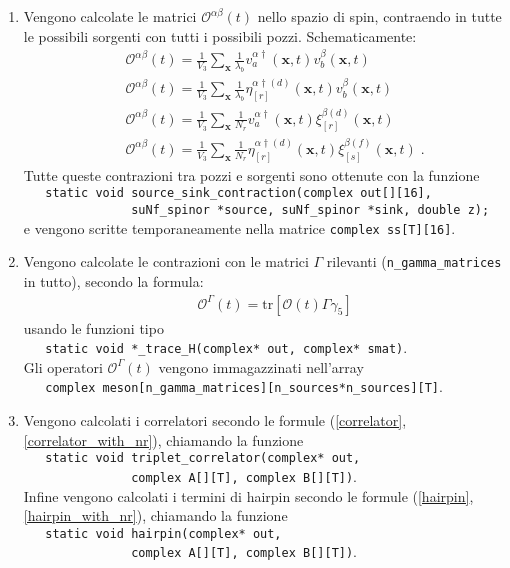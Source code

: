\documentclass[a4paper]{article}
\newcommand{\tr}{\mathrm{tr}}
\newcommand{\point}{\; .}
\begin{document}
\begin{enumerate}
\item Vengono calcolate le matrici $\mathcal{O}^{\alpha\beta}(t)$ nello spazio di spin, contraendo in tutte le possibili sorgenti con tutti i possibili pozzi. Schematicamente:
\begin{eqnarray*}
&& \mathcal{O}^{\alpha\beta}(t) = \frac{1}{V_3} \sum_{\mathbf{x}} \frac{1}{\lambda_b} v^{\alpha\dagger}_a(\mathbf{x},t) v^\beta_b(\mathbf{x},t) \\
&& \mathcal{O}^{\alpha\beta}(t) = \frac{1}{V_3} \sum_{\mathbf{x}} \frac{1}{\lambda_b} \eta^{\alpha\dagger(d)}_{[r]}(\mathbf{x},t) v^\beta_b(\mathbf{x},t) \\
&& \mathcal{O}^{\alpha\beta}(t) = \frac{1}{V_3} \sum_{\mathbf{x}} \frac{1}{N_r} v^{\alpha\dagger}_a(\mathbf{x},t) \xi^{\beta(d)}_{[r]}(\mathbf{x},t) \\
&& \mathcal{O}^{\alpha\beta}(t) = \frac{1}{V_3} \sum_{\mathbf{x}} \frac{1}{N_r} \eta^{\alpha\dagger(d)}_{[r]}(\mathbf{x},t) \xi^{\beta(f)}_{[s]}(\mathbf{x},t) \point
\end{eqnarray*}
Tutte queste contrazioni tra pozzi e sorgenti sono ottenute con la funzione\\
\verb|   static void source_sink_contraction(complex out[][16],|\\
\verb|               suNf_spinor *source, suNf_spinor *sink, double z);|\\
e vengono scritte temporaneamente nella matrice \verb|complex ss[T][16]|. 

\item Vengono calcolate le contrazioni con le matrici $\Gamma$ rilevanti (\verb|n_gamma_matrices| in tutto), secondo la formula:
\begin{eqnarray*}
&& \mathcal{O}^\Gamma(t) = \tr \left[ \mathcal{O}(t) \Gamma \gamma_5 \right]
\end{eqnarray*}
usando le funzioni tipo\\
\verb|   static void *_trace_H(complex* out, complex* smat)|.\\
Gli operatori $\mathcal{O}^\Gamma(t)$ vengono immagazzinati nell'array\\
\verb|   complex meson[n_gamma_matrices][n_sources*n_sources][T]|.

\item Vengono calcolati i correlatori secondo le formule (\ref{correlator}, \ref{correlator_with_nr}), chiamando la funzione\\
\verb|   static void triplet_correlator(complex* out,|\\
\verb|               complex A[][T], complex B[][T])|.\\
Infine vengono calcolati i termini di hairpin secondo le formule (\ref{hairpin}, \ref{hairpin_with_nr}), chiamando la funzione\\
\verb|   static void hairpin(complex* out,|\\
\verb|               complex A[][T], complex B[][T])|.\\


\end{enumerate}
\end{document}
